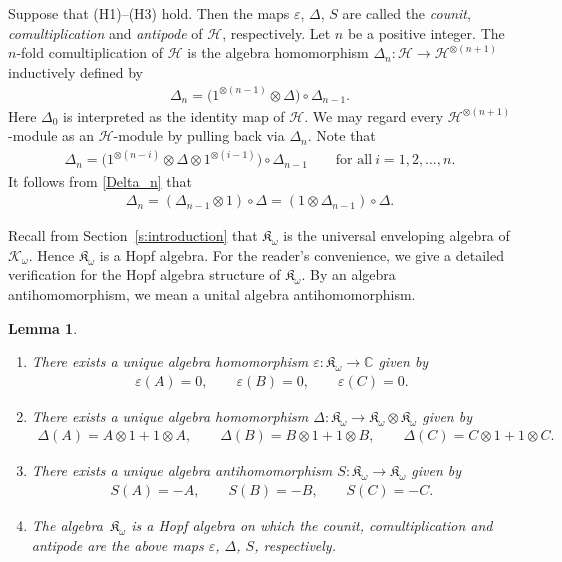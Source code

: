 \documentclass[pdftex]{sigma}%
\def\C{\mathbb C}
\def\H{\mathcal H}
\def\K{\mathfrak K_\omega}
\def\e{\varepsilon}
\numberwithin{equation}{section}
\newtheorem{Lemma}[Theorem]{Lemma}
\begin{document}
Suppose that (H1)--(H3) hold. Then the maps $\e$, $\Delta$, $S$ are called the {\it counit}, {\it comultiplication} and {\it antipode} of $\H$, respectively. Let $n$ be a positive integer.
The $n$-fold comultiplication of $\H$ is the algebra homomorphism $\Delta_n\colon \H\to \H^{\otimes (n+1)}$ inductively defined by
\begin{gather*}
\Delta_n=\big(1^{\otimes(n-1)}\otimes \Delta\big)\circ \Delta_{n-1}.
\end{gather*}
Here $\Delta_0$ is interpreted as the identity map of $\H$.
We may regard every $\H^{\otimes (n+1)}$-module as an $\H$-module by pulling back via $\Delta_n$. Note that
\begin{gather}\label{Delta_n}
\Delta_n=\big(1^{\otimes(n-i)}\otimes \Delta\otimes 1^{\otimes (i-1)}\big)\circ \Delta_{n-1}\qquad
\text{for all} \ i=1,2,\dots,n.
\end{gather}
It follows from \eqref{Delta_n} that
\begin{gather}\label{Delta_n'}
\Delta_n=(\Delta_{n-1}\otimes 1)\circ \Delta=(1\otimes \Delta_{n-1})\circ \Delta.
\end{gather}

Recall from Section~\ref{s:introduction} that $\K$ is the universal enveloping algebra of $\mathcal K_\omega$. Hence $\K$ is a Hopf algebra.
For the reader's convenience, we give a detailed verification for the Hopf algebra structure of $\K$. By an algebra antihomomorphism, we mean a unital algebra antihomomorphism.

{\samepage\begin{Lemma}\label{lem:Hopf_K}\quad
\begin{enumerate}\itemsep=0pt
\item[$(i)$] There exists a unique algebra homomorphism $\e\colon \K\to \C$ given by
\begin{gather*}
\e(A)=0,\qquad
\e(B)=0,\qquad
\e(C)=0.
\end{gather*}

\item[$(ii)$] There exists a unique algebra homomorphism $\Delta\colon \K\to \K\otimes \K$ given by
\begin{gather*}
\Delta(A)=A\otimes 1+1\otimes A,\qquad
\Delta(B)=B\otimes 1+1\otimes B,\qquad
\Delta(C)=C\otimes 1+1\otimes C.
\end{gather*}

\item[$(iii)$] There exists a unique algebra antihomomorphism $S\colon \K\to \K$ given by
\begin{gather*}
S(A)=-A,\qquad
S(B)=-B,\qquad
S(C)=-C.
\end{gather*}

\item[$(iv)$] The algebra~$\K$ is a Hopf algebra on which the counit, comultiplication and antipode are the above maps $\e$, $\Delta$, $S$, respectively.
\end{enumerate}
\end{Lemma}}
\end{document}
